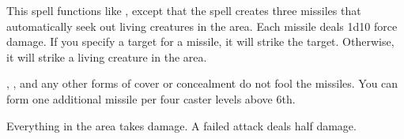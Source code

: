 \spellrng{\rngmed}
\begin{spelleffect}
    This spell functions like , except that the spell creates three missiles that automatically seek out living creatures in the area. Each missile deals 1d10 force damage. If you specify a target for a missile, it will strike the target. Otherwise, it will strike a living creature in the area.

    , , and any other forms of cover or concealment do not fool the missiles. You can form one additional missile per four caster levels above 6th.
\end{spelleffect}

\begin{spelleffect}
    Everything in the area takes damage. A failed attack deals half damage.
\end{spelleffect}
\begin{spellnotes}
    \destructivespellnotes
\end{spellnotes}

